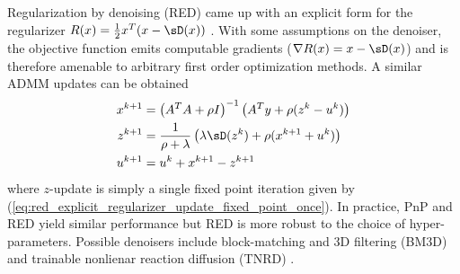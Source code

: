 \documentclass[../writeup.tex]{subfiles}
\begin{document}
Regularization by denoising (RED) came up with an explicit form for the regularizer $R(x) = \frac{1}{2} x^T (x-\sD(x))$ \cite{romanoLittleEngineThat2016,reehorstRegularizationDenoisingClarifications2018}. With some assumptions on the denoiser, the objective function emits computable gradients ($\nabla R(x) = x-\sD(x)$) and is therefore amenable to arbitrary first order optimization methods. A similar ADMM updates can be obtained
\begin{align} 
    x^{k+1}
        &= \left( A^TA + \rho I \right)^{-1} \left( A^Ty + \rho(z^{k} - u^k) \right) \\
    z^{k+1}
        &= \frac{1}{\rho + \lambda} \left(
            \lambda \sD(z^{k}) + \rho ( x^{k+1} + u^k  )
        \right) \\
    u^{k+1}
        &= u^k + x^{k+1} - z^{k+1}
    \label{eq:red_admm_update_equations}
\end{align}
where $z$-update is simply a single fixed point iteration given by (\ref{eq:red_explicit_regularizer_update_fixed_point_once}). In practice, PnP and RED yield similar performance but RED is more robust to the choice of hyper-parameters. Possible denoisers include  block-matching and 3D filtering (BM3D) \cite{dabovImageDenoisingSparse2007} and trainable nonlienar reaction diffusion (TNRD) \cite{chenTrainableNonlinearReaction2017}. 
\end{document}
